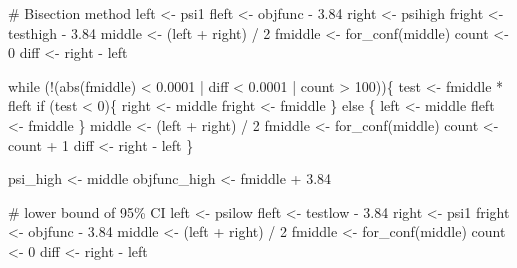 \documentclass[
  10pt,
  a4paper,
]{book}
\newenvironment{Shaded}{\begin{snugshade}}{\end{snugshade}}
\newcommand{\CommentTok}[1]{\textcolor[rgb]{0.37,0.37,0.37}{#1}}
\newcommand{\ControlFlowTok}[1]{\textcolor[rgb]{0.00,0.46,0.62}{#1}}
\newcommand{\DecValTok}[1]{\textcolor[rgb]{0.68,0.00,0.00}{#1}}
\newcommand{\FloatTok}[1]{\textcolor[rgb]{0.68,0.00,0.00}{#1}}
\newcommand{\FunctionTok}[1]{\textcolor[rgb]{0.28,0.35,0.67}{#1}}
\newcommand{\NormalTok}[1]{\textcolor[rgb]{0.00,0.46,0.62}{#1}}
\newcommand{\OtherTok}[1]{\textcolor[rgb]{0.00,0.46,0.62}{#1}}
\newcommand{\SpecialCharTok}[1]{\textcolor[rgb]{0.37,0.37,0.37}{#1}}
\begin{document}
\begin{Shaded}
\begin{Highlighting}[]
    \CommentTok{\# Bisection method}
\NormalTok{    left }\OtherTok{\textless{}{-}}\NormalTok{ psi1}
\NormalTok{    fleft }\OtherTok{\textless{}{-}}\NormalTok{ objfunc }\SpecialCharTok{{-}} \FloatTok{3.84}
\NormalTok{    right }\OtherTok{\textless{}{-}}\NormalTok{ psihigh}
\NormalTok{    fright }\OtherTok{\textless{}{-}}\NormalTok{ testhigh }\SpecialCharTok{{-}} \FloatTok{3.84}
\NormalTok{    middle }\OtherTok{\textless{}{-}}\NormalTok{ (left  }\SpecialCharTok{+}\NormalTok{ right) }\SpecialCharTok{/} \DecValTok{2}
\NormalTok{    fmiddle }\OtherTok{\textless{}{-}} \FunctionTok{for\_conf}\NormalTok{(middle)}
\NormalTok{    count }\OtherTok{\textless{}{-}} \DecValTok{0}
\NormalTok{    diff }\OtherTok{\textless{}{-}}\NormalTok{ right }\SpecialCharTok{{-}}\NormalTok{ left}

    \ControlFlowTok{while}\NormalTok{ (}\SpecialCharTok{!}\NormalTok{(}\FunctionTok{abs}\NormalTok{(fmiddle) }\SpecialCharTok{\textless{}} \FloatTok{0.0001} \SpecialCharTok{|}\NormalTok{ diff }\SpecialCharTok{\textless{}} \FloatTok{0.0001} \SpecialCharTok{|}\NormalTok{ count }\SpecialCharTok{\textgreater{}} \DecValTok{100}\NormalTok{))\{}
\NormalTok{      test }\OtherTok{\textless{}{-}}\NormalTok{ fmiddle }\SpecialCharTok{*}\NormalTok{ fleft}
      \ControlFlowTok{if}\NormalTok{ (test }\SpecialCharTok{\textless{}} \DecValTok{0}\NormalTok{)\{}
\NormalTok{        right }\OtherTok{\textless{}{-}}\NormalTok{ middle}
\NormalTok{        fright }\OtherTok{\textless{}{-}}\NormalTok{ fmiddle}
\NormalTok{      \} }\ControlFlowTok{else}\NormalTok{ \{}
\NormalTok{        left }\OtherTok{\textless{}{-}}\NormalTok{ middle}
\NormalTok{        fleft }\OtherTok{\textless{}{-}}\NormalTok{ fmiddle}
\NormalTok{      \}}
\NormalTok{      middle }\OtherTok{\textless{}{-}}\NormalTok{ (left }\SpecialCharTok{+}\NormalTok{ right) }\SpecialCharTok{/} \DecValTok{2}
\NormalTok{      fmiddle }\OtherTok{\textless{}{-}} \FunctionTok{for\_conf}\NormalTok{(middle)}
\NormalTok{      count }\OtherTok{\textless{}{-}}\NormalTok{ count }\SpecialCharTok{+} \DecValTok{1}
\NormalTok{      diff }\OtherTok{\textless{}{-}}\NormalTok{ right }\SpecialCharTok{{-}}\NormalTok{ left}
\NormalTok{    \}}

\NormalTok{    psi\_high }\OtherTok{\textless{}{-}}\NormalTok{ middle}
\NormalTok{    objfunc\_high }\OtherTok{\textless{}{-}}\NormalTok{ fmiddle }\SpecialCharTok{+} \FloatTok{3.84}

    \CommentTok{\# lower bound of 95\% CI}
\NormalTok{    left }\OtherTok{\textless{}{-}}\NormalTok{ psilow}
\NormalTok{    fleft }\OtherTok{\textless{}{-}}\NormalTok{ testlow }\SpecialCharTok{{-}} \FloatTok{3.84}
\NormalTok{    right }\OtherTok{\textless{}{-}}\NormalTok{ psi1}
\NormalTok{    fright }\OtherTok{\textless{}{-}}\NormalTok{ objfunc }\SpecialCharTok{{-}} \FloatTok{3.84}
\NormalTok{    middle }\OtherTok{\textless{}{-}}\NormalTok{ (left }\SpecialCharTok{+}\NormalTok{ right) }\SpecialCharTok{/} \DecValTok{2}
\NormalTok{    fmiddle }\OtherTok{\textless{}{-}} \FunctionTok{for\_conf}\NormalTok{(middle)}
\NormalTok{    count }\OtherTok{\textless{}{-}} \DecValTok{0}
\NormalTok{    diff }\OtherTok{\textless{}{-}}\NormalTok{ right }\SpecialCharTok{{-}}\NormalTok{ left}


\end{Highlighting}
\end{Shaded}
\end{document}
